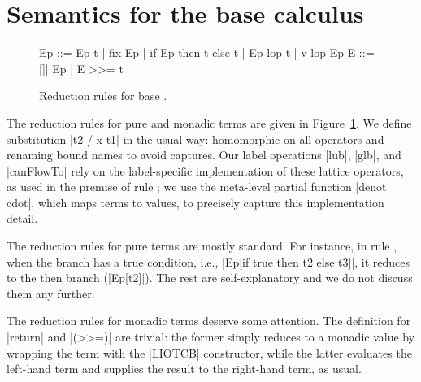 \appendices
\section{Semantics for the base calculus}
\label{sec:app:sem}

\begin{figure} %
\small
\begin{code}
Ep  ::= Ep t | fix Ep | if Ep then t else t | Ep lop t | v lop Ep
E   ::= []| Ep | E >>= t 
\end{code}

\caption{Reduction rules for base \lio.\label{fig:sos:rules}}
\end{figure}


The reduction rules for pure and monadic terms are given in
Figure~\ref{fig:sos:rules}. 
% 
We define substitution |{t2 / x } t1| in the
usual way: homomorphic on all operators and renaming bound names to avoid
captures.
%
Our label operations |lub|, |glb|, and |canFlowTo| rely on the label-specific
implementation of these lattice operators, as used in the premise of rule
; we use the meta-level partial function |denot cdot|, which
maps terms to values, to precisely capture this implementation detail.

%
The reduction rules for pure terms are mostly standard. For instance, 
in rule , when the branch has a true condition, i.e., 
|Ep[if true then t2 else t3]|, it reduces to the then branch (|Ep[t2]|). 
The rest are self-explanatory and we do not discuss them any further. 
%

%
The reduction rules for monadic terms deserve some attention.
%
The definition for |return| and |(>>=)| are trivial: the former simply reduces
to a monadic value by wrapping the term with the |LIOTCB| constructor, while the
latter evaluates the left-hand term and supplies the result to the right-hand
term, as usual.


